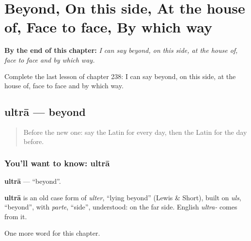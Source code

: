
\chapter{Beyond, On this side, At the house of, Face to face, By which way}
\label{ch:la-beyond-on-this-side-at-the-house-of-face-to-face-by-which-way}

\begin{chapteropening}
\textbf{By the end of this chapter:} \emph{I can say beyond, on this side, at the house of, face to face and by which way.}

Complete the last lesson of chapter 238: I can say beyond, on this side, at the house of, face to face and by which way.
\end{chapteropening}

\section[ultrā]{ultrā — beyond}

\label{lesson:LA-C238-ultra}



\begin{quote}
Before the new one: say the Latin for every day, then the Latin for the day before.
\end{quote}

\subsection*{You'll want to know: ultrā}
\textbf{ultrā} — \textquotedblleft{}beyond\textquotedblright{}.

\begin{cousinweb}
\textbf{ultrā} is an old case form of \emph{ulter}, \textquotedblleft{}lying beyond\textquotedblright{} (Lewis \& Short), built on \emph{uls}, \textquotedblleft{}beyond\textquotedblright{}, with \emph{parte}, \textquotedblleft{}side\textquotedblright{}, understood: on the far side. English \emph{ultra-} comes from it.
\end{cousinweb}

\begin{grammarlens}[title={What you've built}]
One more word for this chapter.
\end{grammarlens}

